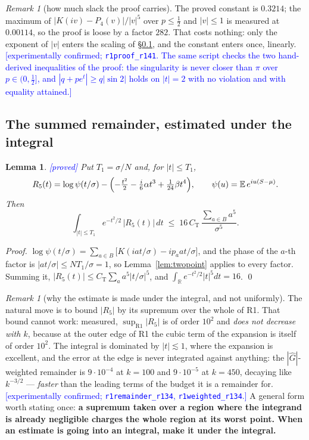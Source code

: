 \documentclass[11pt,a4paper]{article}
\theoremstyle{plain}
\newtheorem{lemma}[theorem]{Lemma}
\theoremstyle{definition}
\theoremstyle{remark}
\newtheorem{remark}[theorem]{Remark}
\newcommand{\STATUS}[1]{\textcolor{blue}{\textsf{[#1]}}}
\begin{document}
\begin{remark}[how much slack the proof carries]\label{rem:slack}
The proved constant is $0.3214$; the maximum of
$|K(iv)-P_4(v)|/|v|^{5}$ over $p\le\tfrac12$ and $|v|\le1$ is measured at $0.00114$, so the
proof is loose by a factor $282$. That costs nothing: only the exponent of $|v|$ enters the
scaling of \S\ref{app:sum}, and the constant enters once, linearly.
\STATUS{experimentally confirmed; \texttt{r1proof\_r141}. The same script checks the two
hand-derived inequalities of the proof: the singularity is never closer than $\pi$ over
$p\in(0,\tfrac12]$, and $|q+pe^{t}|\ge q|\sin2|$ holds on $|t|=2$ with no violation and with
equality attained.}
\end{remark}

\subsection{The summed remainder, estimated under the integral}\label{app:sum}

\begin{lemma}\label{lem:sumrem}
\STATUS{proved}
Put $T_1=\sigma/N$ and, for $|t|\le T_1$,
\[
  R_5(t)=\log\psi(t/\sigma)-\Bigl(-\tfrac{t^{2}}{2}-\tfrac{i}{6}\alpha t^{3}
        +\tfrac{1}{24}\beta t^{4}\Bigr),
  \qquad \psi(u)=\mathbb{E}\,e^{iu(S-\mu)} .
\]
Then
\[
  \int_{|t|\le T_1}e^{-t^{2}/2}\,|R_5(t)|\,dt
  \;\le\;16\,C_{\mathrm{T}}\,\frac{\sum_{a\in B}a^{5}}{\sigma^{5}} .
\]
\end{lemma}

\begin{proof}
$\log\psi(t/\sigma)=\sum_{a\in B}\bigl[K(iat/\sigma)-ip_aat/\sigma\bigr]$, and the phase of the
$a$-th factor is $|at/\sigma|\le N T_1/\sigma=1$, so Lemma~\ref{lem:twopoint} applies to every
factor. Summing it, $|R_5(t)|\le C_{\mathrm{T}}\sum_a a^{5}|t/\sigma|^{5}$, and
$\int_{\mathbb{R}}e^{-t^{2}/2}|t|^{5}dt=16$. \qed
\end{proof}

\begin{remark}[why the estimate is made under the integral, and not uniformly]\label{rem:notsup}
The natural move is to bound $|R_5|$ by its supremum over the whole of R1. That bound cannot
work: measured, $\sup_{\mathrm{R1}}|R_5|$ is of order $10^{2}$ and \emph{does not decrease with
$k$}, because at the outer edge of R1 the cubic term of the expansion is itself of order
$10^{2}$. The integral is dominated by $|t|\lesssim1$, where the expansion is excellent, and the
error at the edge is never integrated against anything: the $|\hat G|$-weighted remainder is
$9\cdot10^{-4}$ at $k=100$ and $9\cdot10^{-5}$ at $k=450$, decaying like $k^{-3/2}$ ---
\emph{faster} than the leading terms of the budget it is a remainder for.
\STATUS{experimentally confirmed; \texttt{r1remainder\_r134}, \texttt{r1weighted\_r134}.}
A general form worth stating once: \textbf{a supremum taken over a region where the integrand is
already negligible charges the whole region at its worst point. When an estimate is going into
an integral, make it under the integral.}
\end{remark}
\end{document}
